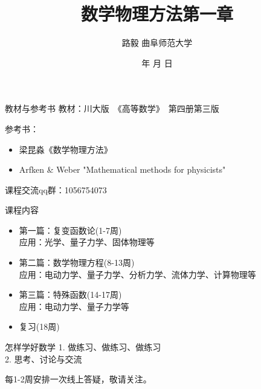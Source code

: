\documentclass[11pt]{beamer}
\newcommand{\kong}[1][0.5]{\vspace{#1cm}}
\begin{document}
	\author{ 路毅 \hspace{0.3cm} 曲阜师范大学 }
	\date{\number\year 年 \number\month 月 \number\day 日}
	\title{数学物理方法第一章}

\begin{frame}
	\maketitle
\end{frame}

\kaishu

\begin{frame}{教材与参考书}
教材：川大版　《高等数学》　第四册第三版

\kong[0.5]

参考书：
\begin{itemize}
\item 梁昆淼《数学物理方法》
\item Arfken \& Weber "Mathematical methods for physicists"
\end{itemize}

\kong[0.5]

课程交流qq群：1056754073
\end{frame}

\begin{frame}{课程内容}
\begin{itemize}
	\item 第一篇：复变函数论(1-7周)\\
		  应用：光学、量子力学、固体物理等\\
		  \vspace{0.5cm}
	\item 第二篇：数学物理方程(8-13周)\\
		  应用：电动力学、量子力学、分析力学、流体力学、计算物理等\\
		  \vspace{0.5cm}
	\item 第三篇：特殊函数(14-17周)\\
	      应用：电动力学、量子力学等\\
		  \vspace{0.5cm}
	\item 复习(18周)
\end{itemize}
\end{frame}

\begin{frame}{怎样学好数学}
1. 做练习、做练习、做练习\\
\vspace{0.5cm}
2. 思考、讨论与交流\\
\vspace{0.5cm}

每1-2周安排一次线上答疑，敬请关注。
\end{frame}
\end{document}
